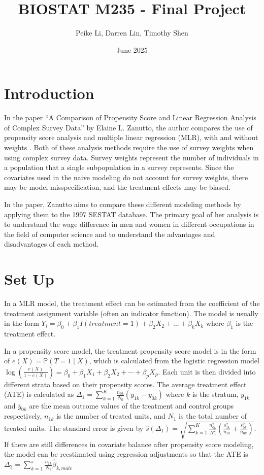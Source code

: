 \documentclass[12pt]{article}
\title{BIOSTAT M235 - Final Project}
\author{Peike Li, Darren Lin, Timothy Shen}
\date{June 2025}
\begin{document}
\doublespacing


\maketitle

\newpage

\section{Introduction} \label{sec:intro}

In the paper “A Comparison of Propensity Score and Linear Regression Analysis of Complex Survey Data” by Elaine L. Zanutto, the author compares the use of propensity score analysis and multiple linear regression (MLR), with and without weights \cite{zanutto_2022}. Both of these analysis methods require the use of survey weights when using complex survey data. Survey weights represent the number of individuals in a population that a single subpopulation in a survey represents. Since the covariates used in the naive modeling do not account for survey weights, there may be model misspecification, and the treatment effects may be biased.

In the paper, Zanutto aims to compare these different modeling methods by applying them to the 1997 SESTAT database. The primary goal of her analysis is to understand the wage difference in men and women in different occupations in the field of computer science and to understand the advantages and disadvantages of each method.


\section{Set Up} \label{sec:setup}

In a MLR model, the treatment effect can be estimated from the coefficient of the treatment assignment variable (often an indicator function). The model is usually in the form $Y_i = \beta_0 + \beta_1 I(treatment = 1) + \beta_2 X_2 + ... + \beta_k X_k$ where $\beta_1$ is the treatment effect.

In a propensity score model, the treatment propensity score model is in the form of $e(X) = \mathbb{P}(T = 1 \mid X)$, which is calculated from the logistic regression model $\log\left( \frac{e(X)}{1 - e(X)} \right) = \beta_0 + \beta_1 X_1 + \beta_2 X_2 + \cdots + \beta_p X_p$. Each unit is then divided into different strata based on their propensity scores. The average treatment effect (ATE) is calculated as $ \Delta_1 = \sum_{k=1}^K \frac{n_{0k}}{N_0}(\bar{y}_{1k} - \bar{y}_{0k})$ where $k$ is the stratum, $\bar{y}_{1k}$ and $\bar{y}_{0k}$ are the mean outcome values of the treatment and control groups respectively, $n_{1k}$ is the number of treated units, and $N_1$ is the total number of treated units. The standard error is given by $\hat{s}(\Delta_1) = \sqrt{\sum_{k=1}^K \frac{n_{0k}^2}{N_0^2} (\frac{s^2_{1k}}{n_{1k}} + \frac{s^2_{0k}}{n_{0k}})}$. If there are still differences in covariate balance after propensity score modeling, the model can be reestimated using regression adjustments so that the ATE is $\Delta_2 = \sum_{k=1}^s \frac{n_{1k}}{N_1} \hat{\beta}_{k,male}$ 
\end{document}
